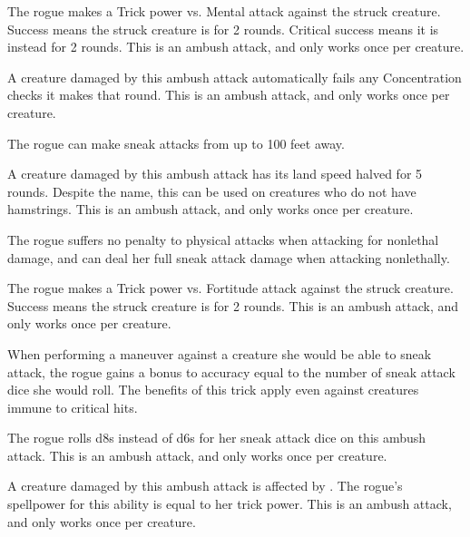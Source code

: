         The rogue makes a Trick power vs. Mental attack against the struck creature.
        Success means the struck creature is \dazed for 2 rounds.
        Critical success means it is instead \confused for 2 rounds.
        This is an ambush attack, and only works once per creature.

        A creature damaged by this ambush attack automatically fails any Concentration checks it makes that round.
        This is an ambush attack, and only works once per creature.

        The rogue can make sneak attacks from up to 100 feet away.

        A creature damaged by this ambush attack has its land speed halved for 5 rounds.
        Despite the name, this can be used on creatures who do not have hamstrings.
        This is an ambush attack, and only works once per creature.

        The rogue suffers no penalty to physical attacks when attacking for nonlethal damage, and can deal her full sneak attack damage when attacking nonlethally.


        The rogue makes a Trick power vs. Fortitude attack against the struck creature.
        Success means the struck creature is \staggered for 2 rounds.
        This is an ambush attack, and only works once per creature.

        When performing a maneuver against a creature she would be able to sneak attack, the rogue gains a bonus to accuracy equal to the number of sneak attack dice she would roll.
        The benefits of this trick apply even against creatures immune to critical hits.

        The rogue rolls d8s instead of d6s for her sneak attack dice on this ambush attack.
        This is an ambush attack, and only works once per creature.

        A creature damaged by this ambush attack is affected by .
        The rogue's spellpower for this ability is equal to her trick power.
        This is an ambush attack, and only works once per creature.

